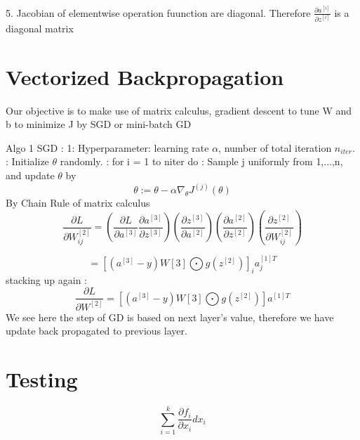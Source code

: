 \documentclass{article}
\begin{document}
5. Jacobian of elementwise operation fuunction are diagonal. Therefore  \( \frac{\partial a^{[i]} }{\partial z^{[i]}} \) is a diagonal matrix \newline




\section{Vectorized Backpropagation}
Our objective is to make use of matrix calculus, gradient descent to tune W and b to minimize J by SGD or mini-batch GD \newline

Algo 1 SGD : 
 1: Hyperparameter: learning rate \(\alpha\), number of total iteration \(n_{iter}\). : Initialize \(\theta\) randomly. : for i = 1 to niter do : Sample j uniformly from {1,...,n}, and update \(\theta\) by \newline
\[ \theta := \theta - \alpha \nabla_\theta J^{(j)}(\theta) \] 
By Chain Rule of matrix calculus 
\[
\frac{\partial L }{\partial W_{ij}^{[2]}} = ( \frac{\partial L }{\partial a^{[3]}} \frac{\partial a^{[3]}}{\partial z^{[3]}} )
(\frac{\partial z^{[3]}}{\partial a^{[2]}}) ( \frac{\partial a^{[2]}}{\partial z^{[2]}})( \frac{\partial z^{[2]}}{\partial W_{ij}^{[2]}})
\]

\[
= [ (a^{[3]}-y)W[3] \bigodot g(z^{[2]}) ]_i a_j^{[1]T} 
\]
stacking up again :
\[
\frac{\partial L }{\partial W^{[2]}} = [ (a^{[3]}-y)W[3] \bigodot g(z^{[2]}) ] a^{[1]T} 
\]
We see here the step of GD is based on next layer's value, therefore we have update back propagated to previous layer.
\section{Testing}
\[
\sum_{i=1}^k \frac{\partial f_i}{\partial x_i} dx_i
\]
\end{document}
